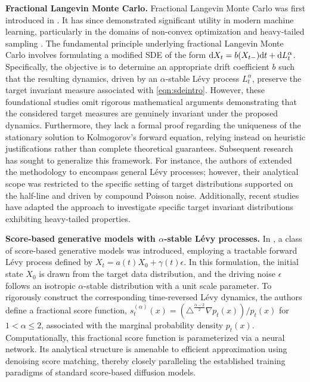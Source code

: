 \textbf{Fractional Langevin Monte Carlo.} Fractional Langevin Monte Carlo was first introduced in \cite{csimcsekli2017fractional,nguyen2019non}. It has since demonstrated significant utility in modern machine learning, particularly in the domains of non-convex optimization and heavy-tailed sampling \cite{zhu2023distributionally,simsekli2020fractional,ye2018stochastic}. The fundamental principle underlying fractional Langevin Monte Carlo involves formulating a modified SDE of the form $\mathrm{d} X_t=b(X_{t-})\mathrm{d} t + \mathrm{d} L_t^\alpha$. Specifically, the objective is to determine an appropriate drift coefficient $b$ such that the resulting dynamics, driven by an $\alpha$-stable L\'{e}vy process $L_t^\alpha$, preserve the target invariant measure associated with \eqref{eqn:sdeintro}. However, these foundational studies omit rigorous mathematical arguments demonstrating that the considered target measures are genuinely invariant under the proposed dynamics. Furthermore, they lack a formal proof regarding the uniqueness of the stationary solution to Kolmogorov's forward equation, relying instead on heuristic justifications rather than complete theoretical guarantees. Subsequent research has sought to generalize this framework. For instance, the authors of \cite{oechsler2024levy} extended the methodology to encompass general L\'{e}vy processes; however, their analytical scope was restricted to the specific setting of target distributions supported on the half-line and driven by compound Poisson noise. Additionally, recent studies \cite{zhang2023ergodicity,behme2025evy} have adapted the approach to investigate specific target invariant distributions exhibiting heavy-tailed properties.



\textbf{Score-based generative models with $\alpha$-stable L\'{e}vy processes.}
In \cite{yoon2023score}, a class of score-based generative models was introduced, employing a tractable forward L\'{e}vy process defined by $X_t = a(t)X_0 + \gamma(t)\epsilon$. In this formulation, the initial state $X_0$ is drawn from the target data distribution, and the driving noise $\epsilon$ follows an isotropic $\alpha$-stable distribution with a unit scale parameter. To rigorously construct the corresponding time-reversed L\'{e}vy dynamics, the authors define a fractional score function, $s_t^{(\alpha)}(x) = (\triangle^{\frac{\alpha-2}{2}} \nabla p_t(x))/p_t(x)$ for $1 < \alpha \le 2$, associated with the marginal probability density $p_t(x)$. Computationally, this fractional score function is parameterized via a neural network. Its analytical structure is amenable to efficient approximation using denoising score matching, thereby closely paralleling the established training paradigms of standard score-based diffusion models.


